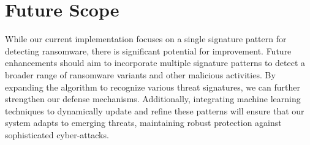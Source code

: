 \documentclass[12pt,letterpaper]{article}
\begin{document}
        \section{Future Scope}

        While our current implementation focuses on a single signature pattern for detecting ransomware, there is significant potential for improvement. Future enhancements should aim to incorporate multiple signature patterns to detect a broader range of ransomware variants and other malicious activities. By expanding the algorithm to recognize various threat signatures, we can further strengthen our defense mechanisms. Additionally, integrating machine learning techniques to dynamically update and refine these patterns will ensure that our system adapts to emerging threats, maintaining robust protection against sophisticated cyber-attacks.

\clearpage
\newpage
{}
    \printbibliography
\end{document}

